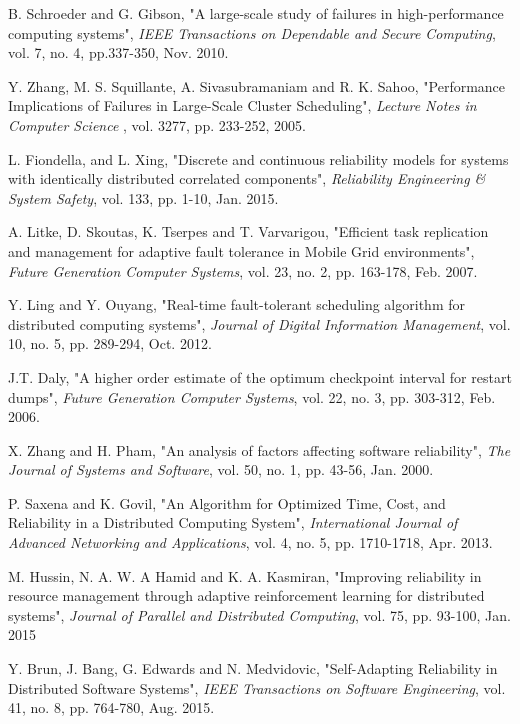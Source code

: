 \documentclass{cslthse-msc}
\begin{document}
\begin{thebibliography}{50}
	B. Schroeder and G. Gibson,
	"A large-scale study of failures in high-performance computing systems",
	\emph{IEEE Transactions on Dependable and Secure Computing}, vol. 7, no. 4, pp.337-350, Nov. 2010.

	Y. Zhang, M. S. Squillante, A. Sivasubramaniam and R. K. Sahoo,
	"Performance Implications of Failures in Large-Scale Cluster Scheduling",
	\emph{Lecture Notes in Computer Science }, vol. 3277, pp. 233-252, 2005. %

	L. Fiondella, and L. Xing,
	"Discrete and continuous reliability models for systems with identically distributed correlated components",
	\emph{Reliability Engineering \& System Safety}, vol. 133, pp. 1-10, Jan. 2015. %

	A. Litke, D. Skoutas, K. Tserpes and T. Varvarigou,
	"Efficient task replication and management for adaptive fault tolerance in Mobile Grid environments",
	\emph{Future Generation Computer Systems}, vol. 23, no. 2, pp. 163-178, Feb. 2007.

	Y. Ling and Y. Ouyang,
	"Real-time fault-tolerant scheduling algorithm for distributed computing systems",
	\emph{Journal of Digital Information Management}, vol. 10, no. 5, pp. 289-294, Oct. 2012.

	J.T. Daly,
	"A higher order estimate of the optimum checkpoint interval for restart dumps",
	\emph{Future Generation Computer Systems}, vol. 22, no. 3, pp. 303-312, Feb. 2006.

	X. Zhang and H. Pham,
	"An analysis of factors affecting software reliability",
	\emph{The Journal of Systems and Software}, vol. 50, no. 1, pp. 43-56, Jan. 2000.

	P. Saxena and K. Govil,
	"An Algorithm for Optimized Time, Cost, and Reliability in a Distributed Computing System",
	\emph{International Journal of Advanced Networking and Applications}, vol. 4, no. 5, pp. 1710-1718, Apr. 2013.

	M. Hussin, N. A. W. A Hamid and K. A. Kasmiran,
	"Improving reliability in resource management through adaptive reinforcement learning for distributed systems",
	\emph{Journal of Parallel and Distributed Computing}, vol. 75, pp. 93-100, Jan. 2015

	Y. Brun, J. Bang, G. Edwards and N. Medvidovic,
	"Self-Adapting Reliability in Distributed Software Systems",
	\emph{IEEE Transactions on Software Engineering}, vol. 41, no. 8, pp. 764-780, Aug. 2015.


\end{thebibliography}
\end{document}

